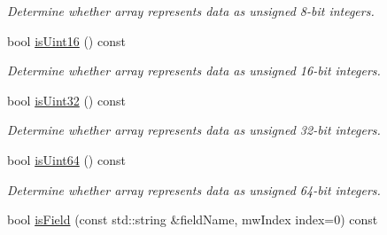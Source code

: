 \begin{DoxyCompactItemize}
\begin{DoxyCompactList}\small\item\em \-Determine whether array represents data as unsigned 8-\/bit integers. \end{DoxyCompactList}\item 
\hypertarget{class_mx_array_aaa21ca835e77c807ac552f5fb600f664}{bool \hyperlink{class_mx_array_aaa21ca835e77c807ac552f5fb600f664}{is\-Uint16} () const }\label{class_mx_array_aaa21ca835e77c807ac552f5fb600f664}

\begin{DoxyCompactList}\small\item\em \-Determine whether array represents data as unsigned 16-\/bit integers. \end{DoxyCompactList}\item 
\hypertarget{class_mx_array_a27de2dec8d022c7baef9a4888a70cc24}{bool \hyperlink{class_mx_array_a27de2dec8d022c7baef9a4888a70cc24}{is\-Uint32} () const }\label{class_mx_array_a27de2dec8d022c7baef9a4888a70cc24}

\begin{DoxyCompactList}\small\item\em \-Determine whether array represents data as unsigned 32-\/bit integers. \end{DoxyCompactList}\item 
\hypertarget{class_mx_array_ac99d3489575db04007101eaad39ccf2c}{bool \hyperlink{class_mx_array_ac99d3489575db04007101eaad39ccf2c}{is\-Uint64} () const }\label{class_mx_array_ac99d3489575db04007101eaad39ccf2c}

\begin{DoxyCompactList}\small\item\em \-Determine whether array represents data as unsigned 64-\/bit integers. \end{DoxyCompactList}\item 
\hypertarget{class_mx_array_a2eb86ac49d720ff4fdb4171c2a9a8561}{bool \hyperlink{class_mx_array_a2eb86ac49d720ff4fdb4171c2a9a8561}{is\-Field} (const std\-::string \&field\-Name, mw\-Index index=0) const }\label{class_mx_array_a2eb86ac49d720ff4fdb4171c2a9a8561}


\end{DoxyCompactItemize}
